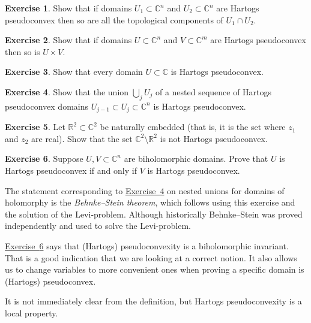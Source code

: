 \documentclass[12pt,openany]{book}
\newcommand{\C}{{\mathbb{C}}}
\newcommand{\R}{{\mathbb{R}}}
\newcommand{\myindex}[1]{#1\index{#1}}
\theoremstyle{plain}
\theoremstyle{remark}
\theoremstyle{definition}
\newenvironment{exbox}{%
    \def\FrameCommand{\vrule width 1pt \relax\hspace {10pt}}%
    \MakeFramed {\advance \hsize -\width \FrameRestore }%
}{%
    \endMakeFramed
}
\theoremstyle{exercise}
\newtheorem{exercise}{Exercise}[section]
\theoremstyle{example}
\newcommand{\exerciseref}[1]{\hyperref[#1]{Exercise~\ref*{#1}}}
\begin{document}
\begin{exbox}
\begin{exercise}
Show that if domains $U_1 \subset \C^n$ and $U_2 \subset \C^n$ are Hartogs
pseudoconvex then so are all the topological components of $U_1 \cap U_2$.
\end{exercise}

\begin{exercise}
Show that if domains $U \subset \C^n$ and $V \subset \C^m$ are Hartogs
pseudoconvex then so is $U \times V$.
\end{exercise}

\begin{exercise}
Show that every domain $U \subset \C$ is Hartogs pseudoconvex.
\end{exercise}

\begin{exercise} \label{exercise:nestedunions}
Show that the union $\bigcup_j U_j$ of a nested sequence of Hartogs pseudoconvex
domains $U_{j-1} \subset U_j \subset \C^n$ is Hartogs pseudoconvex.
\end{exercise}

\begin{exercise}
Let $\R^2 \subset \C^2$ be naturally embedded (that is, it is the
set where $z_1$ and $z_2$ are real).  Show that the set $\C^2 \setminus
\R^2$ is not Hartogs pseudoconvex.
\end{exercise}

\begin{exercise} \label{exercise:biholHartogs}
Suppose $U,V \subset \C^n$ are biholomorphic domains.
Prove that $U$ is Hartogs pseudoconvex if and only if $V$ is
Hartogs pseudoconvex.
\end{exercise}
\end{exbox}

The statement corresponding to \exerciseref{exercise:nestedunions} on nested unions
for domains of holomorphy is
the \emph{\myindex{Behnke--Stein theorem}}, which follows using this exercise and the solution
of the Levi-problem.  Although historically Behnke--Stein was proved
independently and used to solve the Levi-problem.

\exerciseref{exercise:biholHartogs} says that (Hartogs) pseudoconvexity is a
biholomorphic invariant.  That is a good indication that we are looking at a
correct notion.  It also allows us to change variables to more convenient
ones when proving a specific domain is (Hartogs) pseudoconvex.

It is not immediately clear from the definition, but Hartogs pseudoconvexity
is a local property.
\end{document}
